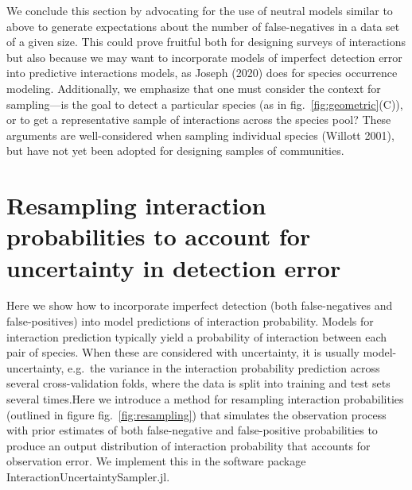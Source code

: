 \documentclass[10pt,oneside]{article}
\begin{document}
We conclude this section by advocating for the use of neutral models
similar to above to generate expectations about the number of
false-negatives in a data set of a given size. This could prove fruitful
both for designing surveys of interactions but also because we may want
to incorporate models of imperfect detection error into predictive
interactions models, as Joseph (2020) does for species occurrence
modeling. Additionally, we emphasize that one must consider the context
for sampling---is the goal to detect a particular species (as in
fig.~\ref{fig:geometric}(C)), or to get a representative sample of
interactions across the species pool? These arguments are
well-considered when sampling individual species (Willott 2001), but
have not yet been adopted for designing samples of communities.

\hypertarget{resampling-interaction-probabilities-to-account-for-uncertainty-in-detection-error}{%
\section{Resampling interaction probabilities to account for uncertainty
in detection
error}\label{resampling-interaction-probabilities-to-account-for-uncertainty-in-detection-error}}

Here we show how to incorporate imperfect detection (both
false-negatives and false-positives) into model predictions of
interaction probability. Models for interaction prediction typically
yield a probability of interaction between each pair of species. When
these are considered with uncertainty, it is usually model-uncertainty,
e.g.~the variance in the interaction probability prediction across
several cross-validation folds, where the data is split into training
and test sets several times.Here we introduce a method for resampling
interaction probabilities (outlined in figure fig.~\ref{fig:resampling})
that simulates the observation process with prior estimates of both
false-negative and false-positive probabilities to produce an output
distribution of interaction probability that accounts for observation
error. We implement this in the software package
InteractionUncertaintySampler.jl.
\end{document}
